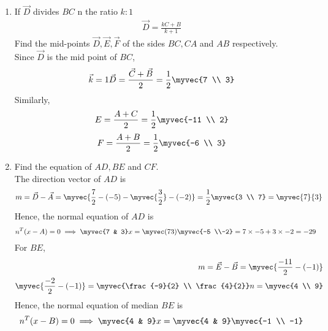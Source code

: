 \documentclass[11pt]{book}
\begin{document}
\begin{enumerate}[label=\thesection.\arabic*.,ref=\thesection.\theenumi]
\item If $\vec{D}$ divides $BC$ n the ratio $k:1$
        \begin{align}
		\vec{D}=\frac{kC+B}{k+1}
	\end{align}
Find the mid-points $\vec{D}, \vec{E}, \vec{F}$ of the sides $BC, CA$ and $AB$ respectively.
         \\
         \solution
Since $\vec{D}$ is the mid point of $BC$,
          \begin{align}
		  \vec{k}=1
		  \vec{D}=\frac{\vec{C}+\vec{B}}{2}=\frac{1}{2} \myvec{7 \\ 3}
	   \end{align}	  
Similarly,
		\begin{align}
			E=\frac{A+C}{2}=\frac{1}{2} \myvec{-11 \\ 2}
                 \end{align} 
		 \begin{align}
F=\frac{A+B}{2}=\frac{1}{2} \myvec{-6 \\ 3}
                 \end{align}
\item Find the equation of $AD, BE$ and $CF$.
	\\
	\solution
The direction vector of $AD$ is
	\begin{align}
	m=\vec{D}-\vec{A}
	 =\myvec{\frac{7}{2} -(-5)-\myvec{\frac{3}{2}}-(-2)}
	=\frac{1}{2} \myvec{3 \\ 7}
	=\myvec{7}{3}
	\end{align}	
Hence, the normal equation of $AD$ is
          \begin{align}
           n^T(x-A)=0
		\implies \myvec{7 & 3}x=\myvec(7 & 3) \myvec{-5 \\-2}
		=7\times -5 + 3\times -2
	        =-29
	    \end{align}	  
For $BE$,
	 \begin{align}
		 m=\vec{E}-\vec{B}
		 =\myvec{\frac{-11}{2}-(-1)} \\ \myvec{\frac{-2}{2} - (-1)}
		 =\myvec{\frac{-9}{2} \\ \frac{4}{2}}
	n=\myvec{4 \\ 9} 
	  \end{align}
Hence, the normal equation of median $BE$ is
          \begin{align}
        n^T(x-B)=0
		\implies \myvec{4 & 9}x=\myvec{4 & 9} \myvec{-1 \\ -1}

\end{align}
\end{enumerate}
\end{document}
